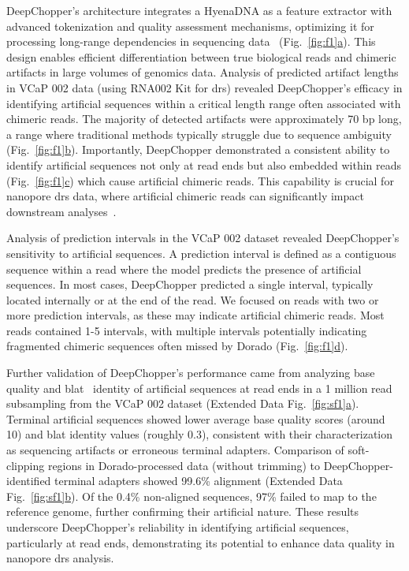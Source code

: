 \documentclass[pdflatex, sn-mathphys-num, lineno]{sn-jnl}%
\newcommand{\figref}[2]{Fig.~\hyperref[#1]{\ref*{#1}#2}}
\newcommand{\edfigref}[2]{Extended Data Fig.~\hyperref[#1]{\ref*{#1}#2}}
\theoremstyle{thmstyleone}%
\theoremstyle{thmstyletwo}%
\theoremstyle{thmstylethree}%
\begin{document}
DeepChopper's architecture integrates a HyenaDNA as a feature extractor with advanced tokenization and quality assessment mechanisms, optimizing it for processing long-range dependencies in sequencing data~\cite{nguyen2024hyenadna} (\figref{fig:f1}{a}).
This design enables efficient differentiation between true biological reads and chimeric artifacts in large volumes of genomics data.
Analysis of predicted artifact lengths in VCaP 002 data (using RNA002 Kit for \gls{drs}) revealed DeepChopper's efficacy in identifying artificial sequences within a critical length range often associated with chimeric reads.
The majority of detected artifacts were approximately 70 bp long, a range where traditional methods typically struggle due to sequence ambiguity (\figref{fig:f1}{b}).
Importantly, DeepChopper demonstrated a consistent ability to identify artificial sequences not only at read ends but also embedded within reads (\figref{fig:f1}{c}) which cause artificial chimeric reads.
This capability is crucial for nanopore \gls{drs} data, where artificial chimeric reads can significantly impact downstream analyses~\cite{smith2020molecular}.

Analysis of prediction intervals in the VCaP 002 dataset revealed DeepChopper's sensitivity to artificial sequences.
A prediction interval is defined as a contiguous sequence within a read where the model predicts the presence of artificial sequences.
In most cases, DeepChopper predicted a single interval, typically located internally or at the end of the read.
We focused on reads with two or more prediction intervals, as these may indicate artificial chimeric reads.
Most reads contained 1-5 intervals, with multiple intervals potentially indicating fragmented chimeric sequences often missed by Dorado (\figref{fig:f1}{d}).

Further validation of DeepChopper's performance came from analyzing base quality and \gls{blat}~\cite{kent2002blat} identity of artificial sequences at read ends in a 1 million read subsampling from the VCaP 002 dataset (\edfigref{fig:sf1}{a}).
Terminal artificial sequences showed lower average base quality scores (around 10) and \gls{blat} identity values (roughly 0.3), consistent with their characterization as sequencing artifacts or erroneous terminal adapters.
Comparison of soft-clipping regions in Dorado-processed data (without trimming) to DeepChopper-identified terminal adapters showed 99.6\% alignment (\edfigref{fig:sf1}{b}).
Of the 0.4\% non-aligned sequences, 97\% failed to map to the reference genome, further confirming their artificial nature.
These results underscore DeepChopper's reliability in identifying artificial sequences, particularly at read ends, demonstrating its potential to enhance data quality in nanopore \gls{drs} analysis.
\end{document}
